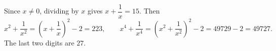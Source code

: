 Since $x\ne0$, dividing by $x$ gives $x+\dfrac{1}{x}=15$. Then
\[
x^2+\dfrac{1}{x^2}=\left(x+\dfrac{1}{x}\right)^2-2=223,\qquad x^4+\dfrac{1}{x^4}=\left(x^2+\dfrac{1}{x^2}\right)^2-2=49729-2=49727 .
\]
The last two digits are $\boxed{27}$.
